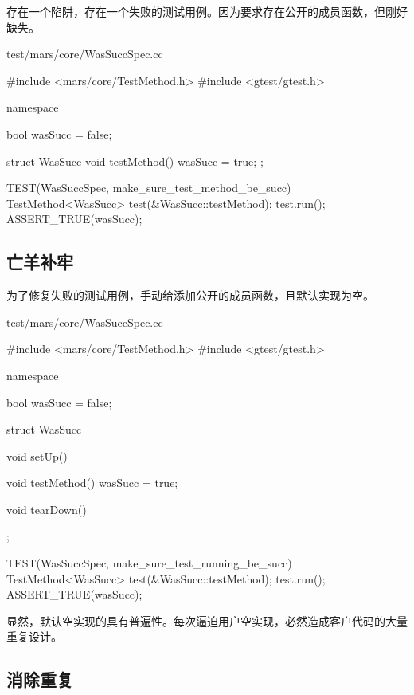 \begin{content}

存在一个陷阱，存在一个失败的测试用例。因为要求存在公开的成员函数，但刚好缺失。

\begin{nodiff}{test/mars/core/WasSuccSpec.cc}
\begin{c++}
#include <mars/core/TestMethod.h>
#include <gtest/gtest.h>

namespace {
  bool wasSucc = false;

  struct WasSucc {
    void testMethod() {
      wasSucc = true;
    }
  };
}

TEST(WasSuccSpec, make_sure_test_method_be_succ) {
  TestMethod<WasSucc> test(&WasSucc::testMethod);
  test.run();
  ASSERT_TRUE(wasSucc);
}
\end{c++}
\end{nodiff}

\subsection{亡羊补牢}

为了修复失败的测试用例，手动给添加公开的成员函数，且默认实现为空。

\begin{nodiff}{test/mars/core/WasSuccSpec.cc}
\begin{c++}
#include <mars/core/TestMethod.h>
#include <gtest/gtest.h>

namespace {
  bool wasSucc = false;

  struct WasSucc {
    void setUp() {
    }

    void testMethod() {
      wasSucc = true;
    }

    void tearDown() {
    }
  };
}

TEST(WasSuccSpec, make_sure_test_running_be_succ) {
  TestMethod<WasSucc> test(&WasSucc::testMethod);
  test.run();
  ASSERT_TRUE(wasSucc);
}
\end{c++}
\end{nodiff}

显然，默认空实现的具有普遍性。每次逼迫用户空实现，必然造成客户代码的大量重复设计。

\subsection{消除重复}


\end{content}
